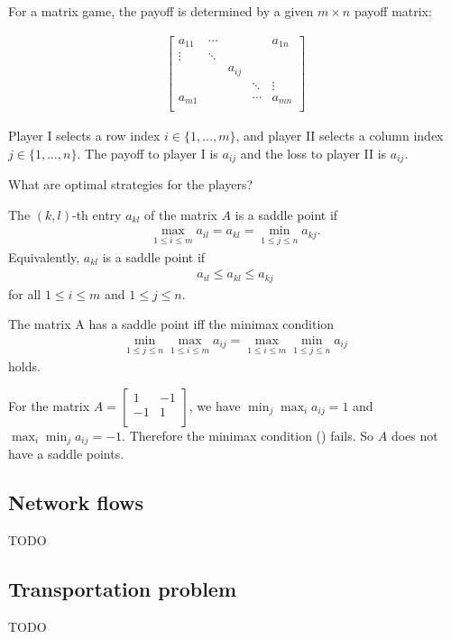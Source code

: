 For a matrix game, the payoff is determined by a given $m \times n$ payoff matrix:

\begin{align}
    \begin{bmatrix}
        a_{11} & \cdots &        &        & a_{1n} \\
        \vdots & \ddots &        &        & \\
               &        & a_{ij} &        & \\
               &        &        & \ddots & \vdots \\
        a_{m1} &        &        & \cdots & a_{mn} \\
    \end{bmatrix}
\end{align}

Player I selects a row index $i \in \{ 1, \dots, m \}$, and player II selects a column index $j \in \{ 1, \dots, n \}$.
The payoff to player I is $a_{ij}$ and the loss to player II is $a_{ij}$.

What are optimal strategies for the players?

\begin{definition}
The $(k,l)$-th entry $a_{kl}$ of the matrix $A$ is a saddle point if 
\begin{align}
    \max _{1 \le i \le m} a_{il} = a_{kl} = \min _{1 \le j \le n} a_{kj}.
\end{align}
Equivalently, $a_{kl}$ is a saddle point if 
\begin{align}
    a_{il} \le a_{kl} \le a_{kj}
\end{align}
for all $1 \le i \le m$ and $1 \le j \le n$.
\end{definition}

\begin{theorem}
    The matrix A has a saddle point iff the minimax condition
    \begin{align}
        \min _{1 \le j \le n} \max _{1 \le i \le m} a_{ij} = \max _{1 \le i \le m} \min _{1 \le j \le n} a_{ij}
    \end{align}
    holds.
\end{theorem}

\begin{example}
    For the matrix $A = \begin{bmatrix} 1 & -1 \\ -1 & 1 \\ \end{bmatrix}$, we have $\min _{j} \max _{i} a_{ij} = 1$ and $\max _{i} \min _{j} a_{ij} = -1$.
    Therefore the minimax condition () fails.
    So $A$ does not have a saddle points.
\end{example}

\subsection{Network flows}

TODO

\subsection{Transportation problem}

TODO